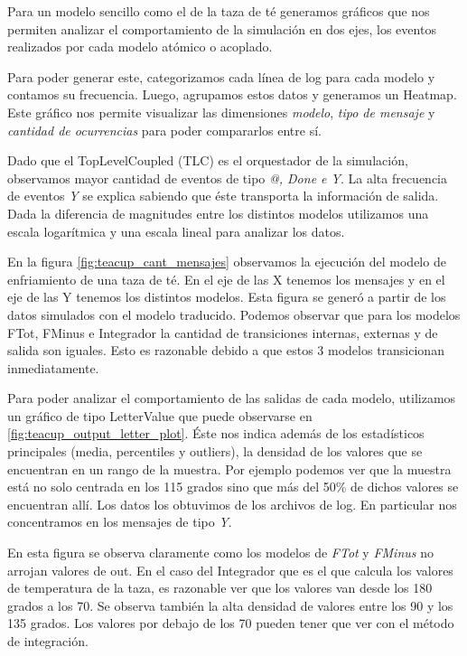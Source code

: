 Para un modelo sencillo como el de la taza de té generamos gráficos que nos
permiten analizar el comportamiento de la simulación en dos ejes, los eventos
realizados por cada modelo atómico o acoplado.

Para poder generar este, categorizamos cada línea de log para cada modelo y
contamos su frecuencia. Luego, agrupamos estos datos y generamos un Heatmap.
Este gráfico nos permite visualizar las dimensiones \textit{modelo}, \textit{tipo de mensaje } y
\textit{cantidad de ocurrencias} para poder compararlos entre sí.

Dado que el TopLevelCoupled (TLC)  es el orquestador de la simulación,
observamos mayor cantidad de eventos de tipo \textit{@, Done e Y}. La alta
frecuencia de eventos \textit{Y} se explica sabiendo que éste  transporta la
información de salida. Dada la diferencia de magnitudes entre los distintos
modelos utilizamos una escala logarítmica y una escala lineal para analizar los
datos.

En la figura \ref{fig:teacup_cant_mensajes} observamos la  ejecución del modelo
de enfriamiento de una taza de té. En el eje de las X tenemos los mensajes y en el eje de las Y tenemos los distintos modelos. Esta figura se generó a partir de los datos simulados con el modelo traducido.
Podemos observar que para los modelos FTot, FMinus e Integrador la cantidad de transiciones internas, externas y de salida
son iguales. Esto es razonable debido a que estos 3 modelos transicionan
inmediatamente.

Para poder analizar el comportamiento de las salidas de cada modelo, utilizamos
un gráfico de tipo LetterValue que puede observarse en \ref{fig:teacup_output_letter_plot}.
Éste nos indica además de los estadísticos
principales (media, percentiles y outliers), la densidad de los valores que se
encuentran en un rango de la muestra. Por ejemplo podemos ver que la muestra
está no solo centrada en los 115 grados sino que más del 50\% de dichos valores
se encuentran allí. Los datos los obtuvimos de los archivos de log. En
particular nos concentramos en los mensajes de tipo \textit{Y}.

En esta figura se observa claramente como los modelos de \textit{FTot} y \textit{FMinus} no
arrojan valores de out. En el caso del Integrador que es el que calcula los
valores de temperatura de la taza, es razonable ver que los valores van desde los 180 grados a los 70. Se observa también la alta densidad de valores entre los 90 y los 135 grados.  Los valores por debajo de los 70 pueden tener que ver con el método de integración. 

